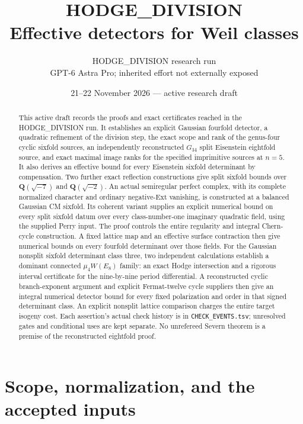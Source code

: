 \documentclass[11pt]{article}
\title{HODGE\_DIVISION\\Effective detectors for Weil classes}
\author{HODGE\_DIVISION research run\\GPT-6 Astra Pro; inherited effort not externally exposed}
\date{21--22 November 2026 --- active research draft}
\theoremstyle{remark}\newtheorem{remark}[theorem]{Remark}
\begin{document}
\maketitle

\begin{abstract}
This active draft records the proofs and exact certificates reached in the
HODGE\_DIVISION run. It establishes an explicit Gaussian fourfold detector,
a quadratic refinement of the division step, the exact scope and rank of
the genus-four cyclic sixfold sources, an independently reconstructed
$G_{34}$ split Eisenstein eightfold source, and exact maximal image ranks
for the specified imprimitive sources at $n=5$. It also derives an effective
bound for every Eisenstein sixfold determinant by compensation. Two further
exact reflection constructions give split sixfold bounds over
$\mathbf Q(\sqrt{-7})$ and $\mathbf Q(\sqrt{-2})$. An actual semiregular
perfect complex, with its complete normalized character and ordinary
negative-Ext vanishing, is constructed at a balanced Gaussian CM sixfold.
Its coherent variant supplies an explicit numerical bound on every
split sixfold datum over every class-number-one imaginary quadratic
field, using the supplied Perry input. The proof controls the entire
regularity and integral Chern-cycle construction. A fixed lattice map
and an effective surface contraction then give numerical bounds on
every fourfold determinant over those fields.
For the Gaussian nonsplit sixfold determinant class three, two
independent calculations establish a dominant connected $\mu_4W(E_8)$
family: an exact Hodge intersection and a rigorous interval certificate
for the nine-by-nine period differential. A reconstructed cyclic
branch-exponent argument and explicit Fermat-twelve cycle suppliers
then give an integral numerical detector bound for every fixed
polarization and order in that signed determinant class. An explicit
nonsplit lattice comparison charges the entire target isogeny cost.
Each assertion's actual check history is in \texttt{CHECK\_EVENTS.tsv};
unresolved gates and conditional uses are kept separate. No unrefereed
Severn theorem is a premise of the reconstructed eightfold proof.
\end{abstract}
\tableofcontents

\section{Scope, normalization, and the accepted inputs}
\end{document}
